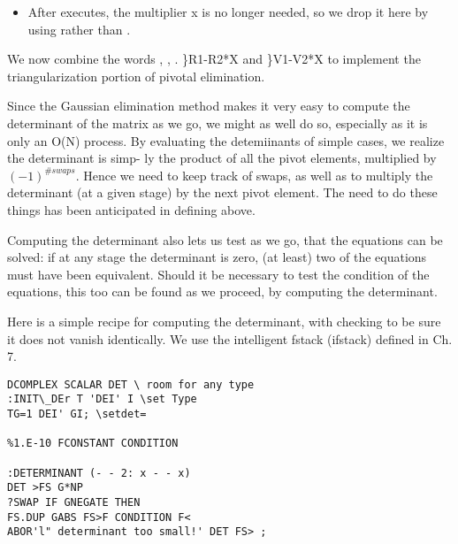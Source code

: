\begin{itemize}
	\item  After  executes, the multiplier x is no longer needed,
		so we drop it here by using  rather than .
\end{itemize}

We now combine the words , , .
\}R1-R2*X and \}V1-V2*X to implement the triangularization portion of pivotal elimination.

Since the Gaussian elimination method makes it very easy to
compute the determinant of the matrix as we go, we might as well
do so, especially as it is only an O(N) process. By evaluating the
detemiinants of simple cases, we realize the determinant is simp-
ly the product of all the pivot elements, multiplied by
$(-1)^{\#swaps}$. Hence we need to keep track of swaps, as well as to
multiply the determinant (at a given stage) by the next pivot
element. The need to do these things has been anticipated in
defining  above.

Computing the determinant also lets us test as we go, that the
equations can be solved: if at any stage the determinant is zero,
(at least) two of the equations must have been equivalent. Should
it be necessary to test the condition of the equations, this too
can be found as we proceed, by computing the determinant.

Here is a simple recipe for computing the determinant, with
checking to be sure it does not vanish identically. We use the
intelligent fstack (ifstack) defined in Ch. 7.

\begin{verbatim}
DCOMPLEX SCALAR DET \ room for any type
:INIT\_DEr T 'DEI' I \set Type
TG=1 DEI' GI; \setdet=

%1.E-10 FCONSTANT CONDITION

:DETERMINANT (- - 2: x - - x)
DET >FS G*NP
?SWAP IF GNEGATE THEN
FS.DUP GABS FS>F CONDITION F<
ABOR'l" determinant too small!' DET FS> ;

\end{verbatim} 


